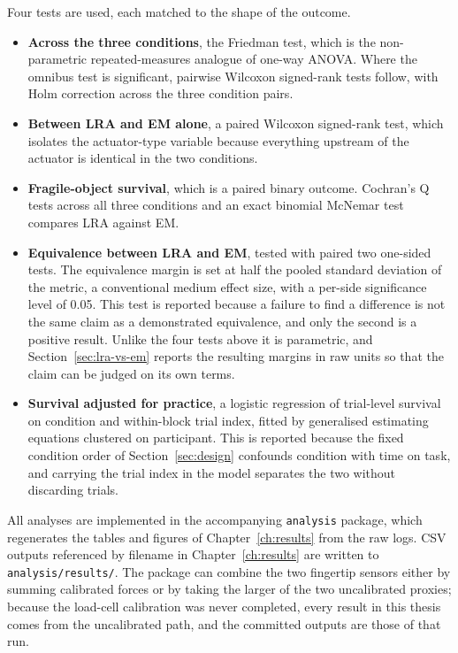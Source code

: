 \documentclass[12pt, a4paper, twoside, openright]{report}
\begin{document}
Four tests are used, each matched to the shape of the outcome.

\begin{itemize}
    \item \textbf{Across the three conditions}, the Friedman test, which is the
          non-parametric repeated-measures analogue of one-way ANOVA. Where the
          omnibus test is significant, pairwise Wilcoxon signed-rank tests
          follow, with Holm correction across the three condition pairs.
    \item \textbf{Between LRA and EM alone}, a paired Wilcoxon signed-rank
          test, which isolates the actuator-type variable because everything
          upstream of the actuator is identical in the two conditions.
    \item \textbf{Fragile-object survival}, which is a paired binary outcome.
          Cochran's Q tests across all three conditions and an exact binomial
          McNemar test compares LRA against EM.
    \item \textbf{Equivalence between LRA and EM}, tested with paired two
          one-sided tests. The equivalence margin is set at half the pooled
          standard deviation of the metric, a conventional medium effect size,
          with a per-side significance level of 0.05. This test is reported
          because a failure to find a difference is not the same claim as a
          demonstrated equivalence, and only the second is a positive result.
          Unlike the four tests above it is parametric, and
          Section~\ref{sec:lra-vs-em} reports the resulting margins in raw
          units so that the claim can be judged on its own terms.
    \item \textbf{Survival adjusted for practice}, a logistic regression of
          trial-level survival on condition and within-block trial index,
          fitted by generalised estimating equations clustered on participant.
          This is reported because the fixed condition order of
          Section~\ref{sec:design} confounds condition with time on task, and
          carrying the trial index in the model separates the two without
          discarding trials.
\end{itemize}

All analyses are implemented in the accompanying \texttt{analysis} package,
which regenerates the tables and figures of Chapter~\ref{ch:results} from the
raw logs. CSV outputs referenced by filename in Chapter~\ref{ch:results} are
written to \texttt{analysis/results/}. The package can combine the two
fingertip sensors either by summing calibrated forces or by taking the larger
of the two uncalibrated proxies; because the load-cell calibration was never
completed, every result in this thesis comes from the uncalibrated path, and
the committed outputs are those of that run.
\end{document}
